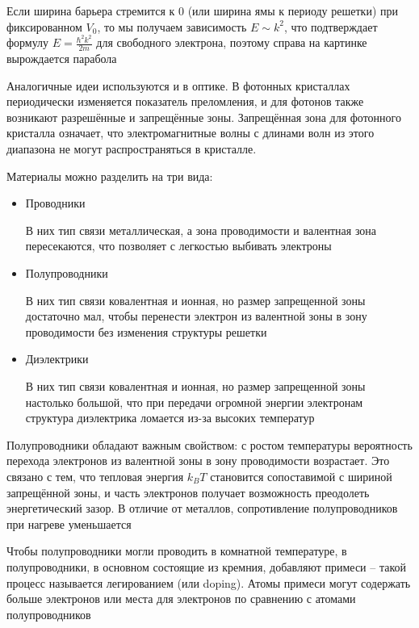 \documentclass[12pt]{article}
\begin{document}
Если ширина барьера стремится к 0 (или ширина ямы к периоду решетки) при фиксированном $V_0$, то мы получаем зависимость $E \sim k^2$, что подтверждает формулу $E = \frac{\hbar^2 k^2}{2m}$ для свободного электрона, поэтому справа на картинке вырождается парабола

\mediumvspace

Аналогичные идеи используются и в оптике. В фотонных кристаллах периодически изменяется показатель преломления, и для фотонов также возникают разрешённые и запрещённые зоны. Запрещённая зона для фотонного кристалла означает, что электромагнитные волны с длинами волн из этого диапазона не могут распространяться в кристалле.






\mediumvspace

Материалы можно разделить на три вида:

\begin{itemize}
    \item Проводники

    В них тип связи металлическая, а зона проводимости и валентная зона пересекаются, что позволяет с легкостью выбивать электроны

    \item Полупроводники
    
    В них тип связи ковалентная и ионная, но размер запрещенной зоны достаточно мал, чтобы перенести электрон из валентной зоны в зону проводимости без изменения структуры решетки

    \item Диэлектрики
    
    В них тип связи ковалентная и ионная, но размер запрещенной зоны настолько большой, что при передачи огромной энергии электронам структура диэлектрика ломается из-за высоких температур
\end{itemize}

Полупроводники обладают важным свойством: с ростом температуры вероятность перехода электронов из валентной зоны в зону проводимости возрастает. Это связано с тем, что тепловая энергия $k_B T$ становится сопоставимой с шириной запрещённой зоны, и часть электронов получает возможность преодолеть энергетический зазор. В отличие от металлов, сопротивление полупроводников при нагреве уменьшается

Чтобы полупроводники могли проводить в комнатной температуре, в полупроводники, в основном состоящие из кремния, добавляют примеси -- такой процесс называется легированием (или doping). Атомы примеси могут содержать больше электронов или места для электронов по сравнению с атомами полупроводников
\end{document}
